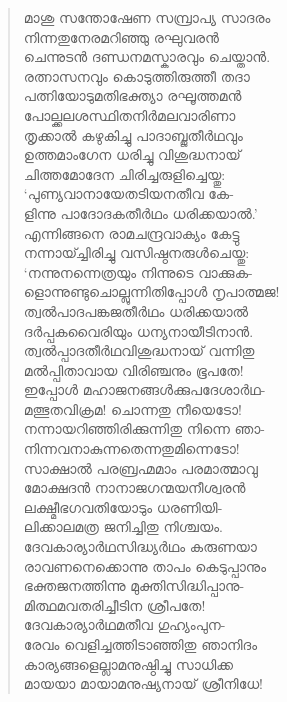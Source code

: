 \begin{verse}
മാശു സന്തോഷേണ സമ്പ്രാപ്യ സാദരം\\
നിന്നതുനേരമറിഞ്ഞു രഘുവരന്‍\\
ചെന്നുടന്‍ ദണ്ഡനമസ്കാരവും ചെയ്താന്‍.\\
രത്നാസനവും കൊടുത്തിരുത്തീ തദാ\\
പത്നിയോടുമതിഭക്ത്യാ രഘൂത്തമന്‍\\
പോല്ക്കലശസ്ഥിതനിര്‍മലവാരിണാ\\
തൃക്കാല്‍ കഴുകിച്ചു പാദാബ്ജതീര്‍ഥവും\\
ഉത്തമാംഗേന ധരിച്ചു വിശുദ്ധനായ്\\
ചിത്തമോദേന ചിരിച്ചരുളിച്ചെയ്തു:\\
‘പുണ്യവാനായേതടിയനതീവ കേ-\\
ളിന്നു പാദോദകതീര്‍ഥം ധരിക്കയാല്‍.’\\
എന്നിങ്ങനെ രാമചന്ദ്രവാക്യം കേട്ടു\\
നന്നായ്ച്ചിരിച്ചു വസിഷ്ഠനരുള്‍ചെയ്തു:\\
‘നന്നുനന്നെത്രയും നിന്നുടെ വാക്കുക-\\
ളൊന്നുണ്ടുചൊല്ലുന്നിതിപ്പോള്‍ നൃപാത്മജ!\\
ത്വല്‍പാദപങ്കജതീര്‍ഥം ധരിക്കയാല്‍\\
ദര്‍പ്പകവൈരിയും ധന്യനായീടിനാന്‍.\\
ത്വല്‍പ്പാദതീര്‍ഥവിശുദ്ധനായ് വന്നിതു\\
മല്‍പ്പിതാവായ വിരിഞ്ചനും ഭൂപതേ!\\
ഇപ്പോള്‍ മഹാജനങ്ങള്‍ക്കുപദേശാര്‍ഥ-\\
മത്ഭുതവിക്രമ! ചൊന്നതു നീയെടോ!\\
നന്നായറിഞ്ഞിരിക്കുന്നിതു നിന്നെ ഞാ-\\
നിന്നവനാകുന്നതെന്നതുമിന്നെടോ!\\
സാക്ഷാല്‍ പരബ്രഹ്മമാം പരമാത്മാവു\\
മോക്ഷദന്‍ നാനാജഗന്മയനീശ്വരന്‍\\
ലക്ഷ്മീഭഗവതിയോടും ധരണിയി-\\
ലിക്കാലമത്ര ജനിച്ചിതു നിശ്ചയം.\\
ദേവകാര്യാര്‍ഥസിദ്ധ്യര്‍ഥം കരുണയാ\\
രാവണനെക്കൊന്നു താപം കെടുപ്പാനും\\
ഭക്തജനത്തിന്നു മുക്തിസിദ്ധിപ്പാനു-\\
മിത്ഥമവതരിച്ചീടിന ശ്രീപതേ!\\
ദേവകാര്യാര്‍ഥമതീവ ഗുഹ്യംപുന-\\
രേവം വെളിച്ചത്തിടാഞ്ഞിതു ഞാനിദം\\
കാര്യങ്ങളെല്ലാമനുഷ്ഠിച്ചു സാധിക്ക\\
മായയാ മായാമനുഷ്യനായ് ശ്രീനിധേ!\\

\end{verse}
